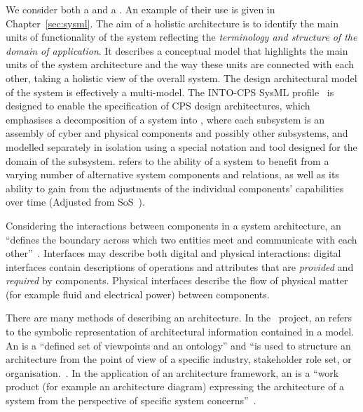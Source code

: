 We consider both a  and a . An example of their use is given in Chapter~\ref{sec:sysml}. The aim of a holistic architecture is to identify the main units of functionality of the system reflecting the \emph{terminology and structure of the domain of application}. It describes a conceptual model that highlights the main units of the system architecture and the way these units are connected with each other, taking a holistic view of the overall system. The design architectural model of the system is effectively a multi-model. The INTO-CPS SysML profile~\cite{INTOCPSD2.1a} is designed to enable the specification of CPS design architectures, which emphasises a decomposition of a system into , where each subsystem is an assembly of cyber and physical components and possibly other subsystems, and modelled separately in isolation using a special notation and tool designed for the domain of the subsystem.  refers to the ability of a system to benefit from a varying number of alternative system components and relations, as well as its ability to gain from the adjustments of the individual components' capabilities over time (Adjusted from SoS~\cite{Nielsen&13}).

Considering the interactions between components in a system architecture, an  ``defines the boundary across which two entities meet and communicate with each other''~\cite{Holt&14}. Interfaces may describe both digital and physical interactions: digital interfaces  contain descriptions of operations and attributes that are \emph{provided} and \emph{required} by components. Physical interfaces describe the flow of physical matter (for example fluid and electrical power) between components.

There are many methods of describing an architecture. In the \into\ project, an  refers to the symbolic representation of architectural information contained in a model. An  is a ``defined set of viewpoints and an ontology'' and ``is used to structure an architecture from the point of view of a specific industry, stakeholder role set, or organisation.~\cite{Holt&14}. In the application of an architecture framework, an  is a ``work product (for example an architecture diagram) expressing the architecture of a system from the perspective of specific system concerns''~\cite{COMPASSD22.6}.

